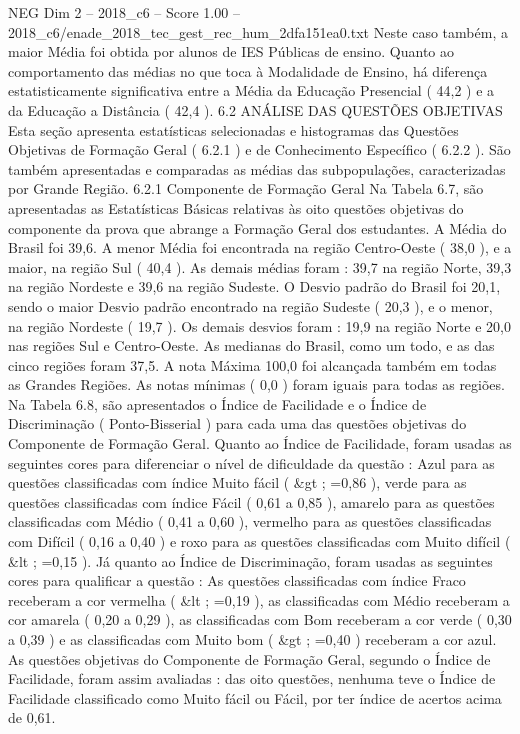 \begin{textsample}{NEG Dim 2 – 2018\_c6 – Score 1.00 – 2018\_c6/enade\_2018\_tec\_gest\_rec\_hum\_2dfa151ea0.txt}
Neste caso também, a maior Média foi obtida por alunos de IES Públicas de ensino.
Quanto ao comportamento das médias no que toca à Modalidade de Ensino, há diferença estatisticamente significativa entre a Média da Educação Presencial ( 44,2 ) e a da Educação a Distância ( 42,4 ). 6.2 ANÁLISE DAS QUESTÕES OBJETIVAS Esta seção apresenta estatísticas selecionadas e histogramas das Questões Objetivas de Formação Geral ( 6.2.1 ) e de Conhecimento Específico ( 6.2.2 ).
São também apresentadas e comparadas as médias das subpopulações, caracterizadas por Grande Região. 6.2.1 Componente de Formação Geral Na Tabela 6.7, são apresentadas as Estatísticas Básicas relativas às oito questões objetivas do componente da prova que abrange a Formação Geral dos estudantes.
A Média do Brasil foi 39,6.
A menor Média foi encontrada na região Centro-Oeste ( 38,0 ), e a maior, na região Sul ( 40,4 ).
As demais médias foram : 39,7 na região Norte, 39,3 na região Nordeste e 39,6 na região Sudeste.
O Desvio padrão do Brasil foi 20,1, sendo o maior Desvio padrão encontrado na região Sudeste ( 20,3 ), e o menor, na região Nordeste ( 19,7 ).
Os demais desvios foram : 19,9 na região Norte e 20,0 nas regiões Sul e Centro-Oeste.
As medianas do Brasil, como um todo, e as das cinco regiões foram 37,5.
A nota Máxima 100,0 foi alcançada também em todas as Grandes Regiões.
As notas mínimas ( 0,0 ) foram iguais para todas as regiões.
Na Tabela 6.8, são apresentados o Índice de Facilidade e o Índice de Discriminação ( Ponto-Bisserial ) para cada uma das questões objetivas do Componente de Formação Geral.
Quanto ao Índice de Facilidade, foram usadas as seguintes cores para diferenciar o nível de dificuldade da questão : Azul para as questões classificadas com índice Muito fácil ( \&gt ; =0,86 ), verde para as questões classificadas com índice Fácil ( 0,61 a 0,85 ), amarelo para as questões classificadas com Médio ( 0,41 a 0,60 ), vermelho para as questões classificadas com Difícil ( 0,16 a 0,40 ) e roxo para as questões classificadas com Muito difícil ( \&lt ; =0,15 ).
Já quanto ao Índice de Discriminação, foram usadas as seguintes cores para qualificar a questão : As questões classificadas com índice Fraco receberam a cor vermelha ( \&lt ; =0,19 ), as classificadas com Médio receberam a cor amarela ( 0,20 a 0,29 ), as classificadas com Bom receberam a cor verde ( 0,30 a 0,39 ) e as classificadas com Muito bom ( \&gt ; =0,40 ) receberam a cor azul.
As questões objetivas do Componente de Formação Geral, segundo o Índice de Facilidade, foram assim avaliadas : das oito questões, nenhuma teve o Índice de Facilidade classificado como Muito fácil ou Fácil, por ter índice de acertos acima de 0,61.

\end{textsample}

